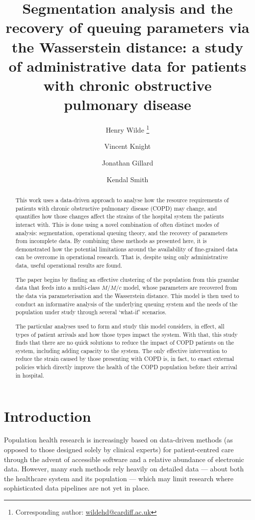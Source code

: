 \documentclass[11pt]{article}
\title{%
    Segmentation analysis and the recovery of queuing parameters via the
    Wasserstein distance: a study of administrative data for patients with
    chronic obstructive pulmonary disease
}
\author[a]{%
    Henry Wilde \footnote{Corresponding author: \url{wildehd@cardiff.ac.uk}}%
}
\author[a]{Vincent Knight}
\author[a]{Jonathan Gillard}
\author[b]{Kendal Smith}
\affil[a]{School of Mathematics, Cardiff University}
\affil[b]{Cwm Taf Morgannwg University Health Board}
\date{}
\begin{document}
\maketitle%

\begin{abstract}
    This work uses a data-driven approach to analyse how the resource
    requirements of patients with chronic obstructive pulmonary disease (COPD)
    may change, and quantifies how those changes affect the strains of the
    hospital system the patients interact with. This is done using a novel
    combination of often distinct modes of analysis: segmentation, operational
    queuing theory, and the recovery of parameters from incomplete data. By
    combining these methods as presented here, it is demonstrated how the
    potential limitations around the availability of fine-grained data can be
    overcome in operational research. That is, despite using only administrative
    data, useful operational results are found.

    The paper begins by finding an effective clustering of the population from
    this granular data that feeds into a multi-class \(M/M/c\) model, whose
    parameters are recovered from the data via parameterisation and the
    Wasserstein distance. This model is then used to conduct an informative
    analysis of the underlying queuing system and the needs of the population
    under study through several `what-if' scenarios.

    The particular analyses used to form and study this model considers, in
    effect, all types of patient arrivals and how those types impact the system.
    With that, this study finds that there are no quick solutions to reduce the
    impact of COPD patients on the system, including adding capacity to the
    system. The only effective intervention to reduce the strain caused by those
    presenting with COPD is, in fact, to enact external policies which directly
    improve the health of the COPD population before their arrival in hospital.
\end{abstract}

\section{Introduction}\label{sec:intro}

Population health research is increasingly based on data-driven methods (as
opposed to those designed solely by clinical experts) for patient-centred care
through the advent of accessible software and a relative abundance of electronic
data. However, many such methods rely heavily on detailed data --- about both
the healthcare system and its population --- which may limit research where
sophisticated data pipelines are not yet in place.
\end{document}
